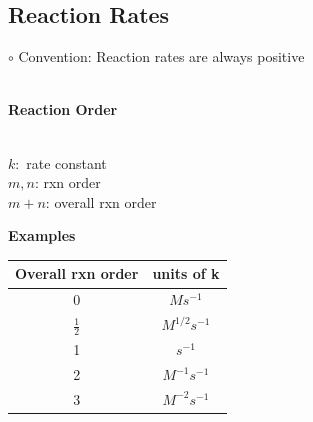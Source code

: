 \subsection{Reaction Rates}
\begin{minipage}{0.5 \linewidth}
$\circ$ Convention: Reaction rates are always positive\\
\\
\begin{minipage}{0.49\linewidth}
\textbf{Reaction Order}\\
\\    
\end{minipage}
\begin{minipage}{0.5\linewidth}
$k:$ rate constant\\
$m, n$: rxn order\\
$m+n$: overall rxn order     
\end{minipage}
   
\end{minipage}
\begin{minipage}{0.49\linewidth}
   
    \begin{center}
     \textbf{Examples}\\
        \begin{tabular}{c|c}
         Overall rxn order & units of k  \\ \hline
         0 & $M s^{-1}$\\
         $\frac{1}{2}$ & $M^{1/2}s^{-1}$\\
         1 & $s^{-1}$\\
         2 & $M^{-1}s^{-1}$\\
         3 & $M^{-2}s^{-1}$
    \end{tabular}    
    \end{center}

\end{minipage}
